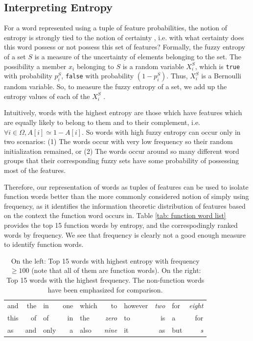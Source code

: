 \documentclass[11pt]{book}
\newcommand{\citep}[1]{\cite{#1}}
\begin{document}
\subsection{Interpreting Entropy} \label{ssec: entropy math} For a word
represented using a tuple of feature probabilities, the notion of entropy is
strongly tied to the notion of certainty \citep{xuecheng1992entropy}, i.e. with
what certainty does this word possess or not possess this set of features?
Formally, the fuzzy entropy of a set $S$ is a measure of the uncertainty of
elements belonging to the set. The possibility a member $x_i$ belonging to $S$
is a random variable $X^S_i$, which is \texttt{true} with probability $p^S_i$,
\texttt{false} with probability $(1 - p^S_i)$. Thus, $X^S_i$ is a Bernoulli
random variable. So, to measure the fuzzy entropy of a set, we add up the
entropy values of each of the $X^S_i$ \citep{mackay2003information}.

Intuitively, words with the highest entropy are those which have features which
are equally likely to belong to them and to their complement, i.e. $\forall i
\in \Omega, A[i] \simeq 1 - A[i]$. So words with high fuzzy entropy can occur
only in two scenarios: (1) The words occur with very low frequency so their
random initialization remained, or (2) The words occur around so many different
word groups that their corresponding fuzzy sets have some probability of
possessing most of the features.

Therefore, our representation of words as tuples of features can be used to
isolate function words better than the more commonly considered notion of
simply using frequency, as it identifies the information theoretic distribution
of features based on the context the function word occurs in. Table \ref{tab:
function word list} provides the top 15 function words by entropy, and the
correspodingly ranked words by frequency. We see that frequency is clearly not
a good enough measure to identify function words.

\begin{table}[t]
    \centering
    \begin{tabular}{l r | l r | l r | l r | l r}
    and		& the   &   in		&   one         &   which	    &   to          &   however	&   \emph{two}  &   for	    &   \emph{eight}  \\
    this    & of    &   of	    &   in          &   the		    &   \emph{zero} &   to		&   is          &   a	    &   for \\
    as	    & and   &   only	&   a           &   also	    &   \emph{nine} &   it		&   as          &   but	    &   \emph{s}
    \end{tabular}
    \caption{On the left: Top 15 words with highest entropy with frequency $\geq 100$ (note that all of them are function words). On the right: Top 15 words with the highest frequency. The non-function words have been emphasized for comparison.}
    \label{tab: function word list}
\end{table}
\end{document}
